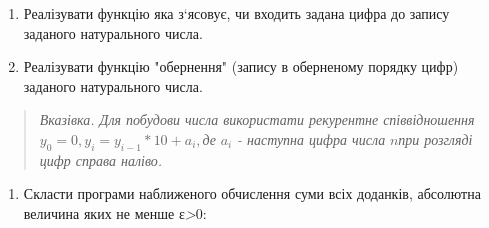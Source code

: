 \documentclass[]{article}
\begin{document}
\begin{enumerate}
\def\labelenumi{\arabic{enumi})}
\item
  Реалізувати функцію яка з`ясовує, чи входить задана цифра до запису
  заданого натурального числа.
\item
  Реалізувати функцію "обернення" (запису в оберненому порядку цифр)
  заданого натурального числа.
\end{enumerate}

\begin{quote}
\emph{\emph{Вказівка. Для побудови числа використати рекурентне
співвідношення}} \(y_{0} = 0,y_{i} = y_{i - 1}*10 + a_{i},\)\emph{де}
\(a_{i}\) \emph{- наступна цифра числа} \(n\)\emph{при розгляді цифр
справа наліво.}
\end{quote}

\begin{enumerate}
\def\labelenumi{\arabic{enumi})}
\item
  Скласти програми наближеного обчислення суми всіх доданків, абсолютна
  величина яких не менше ε\emph{\textgreater{}}0:
\end{enumerate}
\end{document}
